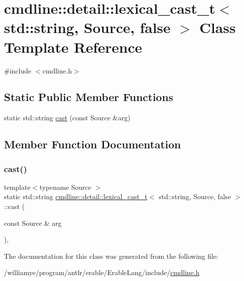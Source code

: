 \hypertarget{classcmdline_1_1detail_1_1lexical__cast__t_3_01std_1_1string_00_01_source_00_01false_01_4}{}\section{cmdline\+::detail\+::lexical\+\_\+cast\+\_\+t$<$ std\+::string, Source, false $>$ Class Template Reference}
\label{classcmdline_1_1detail_1_1lexical__cast__t_3_01std_1_1string_00_01_source_00_01false_01_4}


{\ttfamily \#include $<$cmdline.\+h$>$}

\subsection*{Static Public Member Functions}
\begin{DoxyCompactItemize}
\item 
static std\+::string \mbox{\hyperlink{classcmdline_1_1detail_1_1lexical__cast__t_3_01std_1_1string_00_01_source_00_01false_01_4_af57126abfc4a633919bb63f1425fd69d}{cast}} (const Source \&arg)
\end{DoxyCompactItemize}


\subsection{Member Function Documentation}
\mbox{\label{classcmdline_1_1detail_1_1lexical__cast__t_3_01std_1_1string_00_01_source_00_01false_01_4_af57126abfc4a633919bb63f1425fd69d}} 
\subsubsection{\texorpdfstring{cast()}{cast()}}
{\footnotesize\ttfamily template$<$typename Source $>$ \\
static std\+::string \mbox{\hyperlink{classcmdline_1_1detail_1_1lexical__cast__t}{cmdline\+::detail\+::lexical\+\_\+cast\+\_\+t}}$<$ std\+::string, Source, false $>$\+::cast (\begin{DoxyParamCaption}\item[{const Source \&}]{arg }\end{DoxyParamCaption})\hspace{0.3cm}{\ttfamily [inline]}, {\ttfamily [static]}}



The documentation for this class was generated from the following file\+:\begin{DoxyCompactItemize}
\item 
/williamye/program/antlr/erable/\+Erable\+Lang/include/\mbox{\hyperlink{cmdline_8h}{cmdline.\+h}}\end{DoxyCompactItemize}
